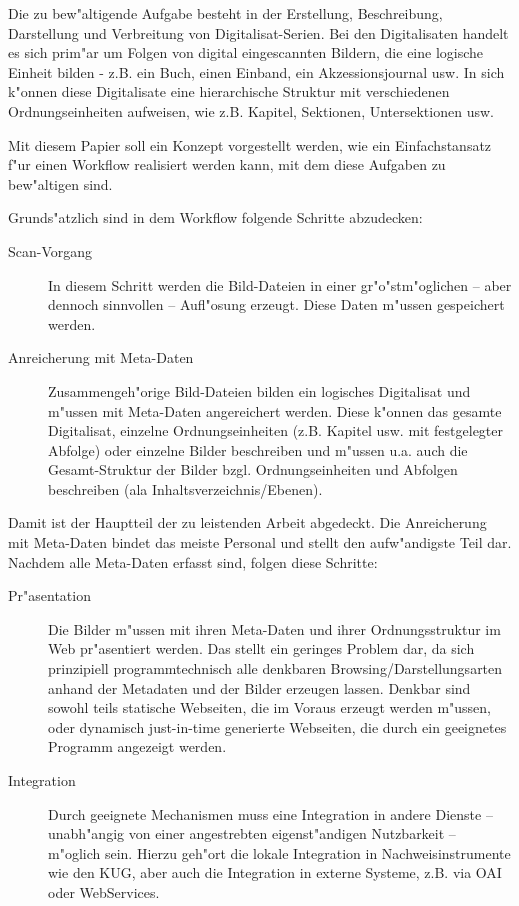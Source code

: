 \documentclass[11pt, twoside, a4paper, BCOR8mm, DIV12, bibtotoc,idxtotoc]{scrreprt}
\begin{document}
Die zu bew"altigende Aufgabe besteht in der Erstellung, Beschreibung,
Darstellung und Ver\-brei\-tung von Digitalisat-Serien. Bei den
Digitalisaten handelt es sich prim"ar um Folgen von digital
ein\-ge\-scann\-ten Bildern, die eine logische Einheit bilden - z.B. ein
Buch, einen Einband, ein Akzessions\-jour\-nal usw. In sich k"onnen diese
Digitalisate eine hierarchische Struktur mit verschiedenen
Ord\-nungs\-einheiten aufweisen, wie z.B. Kapitel, Sektionen,
Untersektionen usw.

Mit diesem Papier soll ein Konzept vorgestellt werden, wie ein
Einfachstansatz f"ur einen Workflow realisiert werden kann, mit dem
diese Aufgaben zu bew"altigen sind.

Grunds"atzlich sind in dem Workflow folgende Schritte abzudecken:

\begin{description}
\item[Scan-Vorgang] In diesem Schritt werden die
  Bild-Dateien in einer gr"o"stm"oglichen -- aber dennoch sinnvollen
  -- Aufl"osung erzeugt. Diese Daten m"ussen gespeichert werden.
\item[Anreicherung mit Meta-Daten] Zusammengeh"orige Bild-Dateien
  bilden ein logisches Digitalisat und m"ussen mit Meta-Daten
  angereichert werden.  Diese k"onnen das gesamte Digitalisat,
  einzelne Ordnungs\-einheiten (z.B. Kapitel usw. mit festgelegter
  Abfolge) oder einzelne Bilder beschreiben und m"ussen u.a. auch die
  Gesamt-Struktur der Bilder bzgl.  Ordnungseinheiten und Abfolgen
  beschreiben (ala Inhaltsverzeichnis/Ebe\-nen).
\end{description}

Damit ist der Hauptteil der zu leistenden Arbeit abgedeckt. Die
Anreicherung mit Meta-Daten bindet das meiste Personal und stellt den
aufw"andigste Teil dar. Nachdem alle Meta-Daten erfasst sind, folgen
diese Schritte:

\begin{description}
\item[Pr"asentation] Die Bilder m"ussen mit ihren Meta-Daten und ihrer
  Ordnungsstruktur im Web pr"asentiert werden. Das stellt ein geringes
  Problem dar, da sich prinzipiell programm\-tech\-nisch alle denkbaren
  Browsing/Darstellungsarten anhand der Metadaten und der Bilder
  erzeugen lassen. Denkbar sind sowohl teils statische Webseiten, die
  im Voraus erzeugt werden m"ussen, oder dynamisch just-in-time
  generierte Webseiten, die durch ein geeignetes Programm angezeigt
  werden.
\item[Integration] Durch geeignete Mechanismen muss eine Integration
  in andere Dienste -- unabh"angig von einer angestrebten
  eigenst"andigen Nutzbarkeit -- m"oglich sein. Hierzu geh"ort die
  lokale Integration in Nachweisinstrumente wie den KUG, aber auch die
  Integration in externe Systeme, z.B. via OAI oder WebServices.

\end{description}
\end{document}
